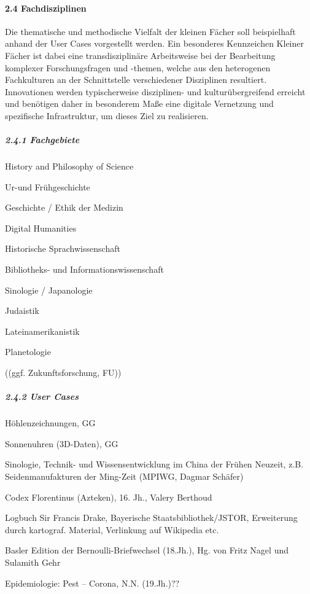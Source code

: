 \hypertarget{fachdisziplinen}{%
\paragraph{2.4 Fachdisziplinen}\label{fachdisziplinen}}

Die thematische und methodische Vielfalt der kleinen Fächer soll
beispielhaft anhand der User Cases vorgestellt werden. Ein besonderes
Kennzeichen Kleiner Fächer ist dabei eine transdisziplinäre Arbeitsweise
bei der Bearbeitung komplexer Forschungsfragen und -themen, welche aus
den heterogenen Fachkulturen an der Schnittstelle verschiedener
Disziplinen resultiert. Innovationen werden typischerweise disziplinen-
und kulturübergreifend erreicht und benötigen daher in besonderem Maße
eine digitale Vernetzung und spezifische Infrastruktur, um dieses Ziel
zu realisieren.

\hypertarget{fachgebiete}{%
\subparagraph{2.4.1 Fachgebiete}\label{fachgebiete}}

History and Philosophy of Science

Ur-und Frühgeschichte

Geschichte / Ethik der Medizin

Digital Humanities

Historische Sprachwissenschaft

Bibliotheks- und Informationswissenschaft

Sinologie / Japanologie

Judaistik

Lateinamerikanistik

Planetologie

((ggf. Zukunftsforschung, FU))

\hypertarget{user-cases}{%
\subparagraph{2.4.2 User Cases}\label{user-cases}}

Höhlenzeichnungen, GG

Sonnenuhren (3D-Daten), GG

Sinologie, Technik- und Wissensentwicklung im China der Frühen Neuzeit,
z.B. Seidenmanufakturen der Ming-Zeit (MPIWG, Dagmar Schäfer)

Codex Florentinus (Azteken), 16. Jh., Valery Berthoud

Logbuch Sir Francis Drake, Bayerische Staatsbibliothek/JSTOR,
Erweiterung durch kartograf. Material, Verlinkung auf Wikipedia etc.

Basler Edition der Bernoulli-Briefwechsel (18.Jh.), Hg. von Fritz Nagel
und Sulamith Gehr

Epidemiologie: Pest -- Corona, N.N. (19.Jh.)??

